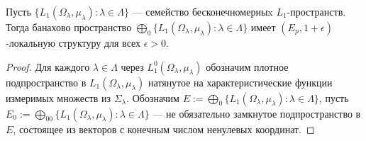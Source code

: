 \begin{proposition}\label{C0SumOfL1SpHaveDPP} Пусть $\{L_1(\Omega_\lambda,\mu_\lambda):\lambda\in\Lambda\}$ --- семейство бесконечномерныx $L_1$-пространств. Тогда банахово пространство $\bigoplus_0\{L_1(\Omega_\lambda,\mu_\lambda):\lambda\in\Lambda\}$ имеет $(E_p,1+\epsilon)$-локальную структуру для всех $\epsilon>0$.
\end{proposition}
\begin{proof} Для каждого $\lambda\in\Lambda$ через $L_1^0(\Omega_\lambda,\mu_\lambda)$ обозначим плотное подпространство в $L_1(\Omega_\lambda,\mu_\lambda)$ натянутое на характеристические функции измеримых множеств из $\Sigma_\lambda$. Обозначим $E:=\bigoplus_0\{L_1(\Omega_\lambda,\mu_\lambda):\lambda\in\Lambda\}$, пусть $E_0:=\bigoplus_{00}\{L_1(\Omega_\lambda,\mu_\lambda):\lambda\in\Lambda\}$ --- не обязательно замкнутое подпространство в $E$, состоящее из векторов с конечным числом ненулевых координат.


\end{proof}
